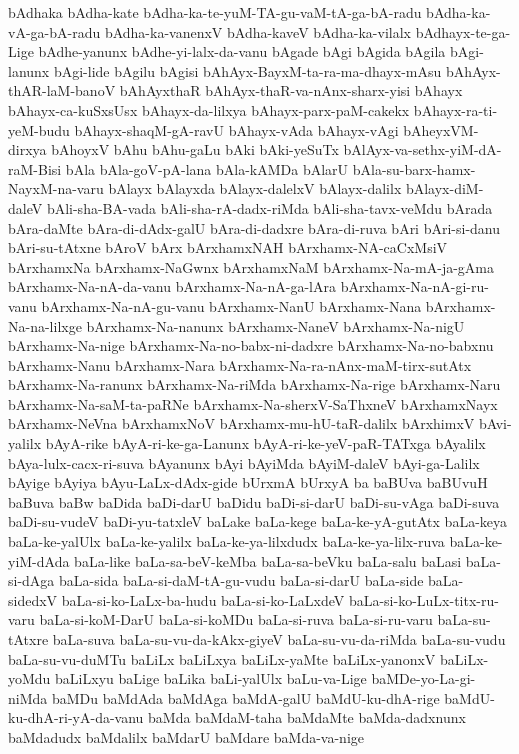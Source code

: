 {bAdhaka
bAdha-kate
bAdha-ka-te-yuM-TA-gu-vaM-tA-ga-bA-radu
bAdha-ka-vA-ga-bA-radu
bAdha-ka-vanenxV
bAdha-kaveV
bAdha-ka-vilalx
bAdhayx-te-ga-Lige
bAdhe-yanunx
bAdhe-yi-lalx-da-vanu
bAgade
bAgi
bAgida
bAgila
bAgi-lanunx
bAgi-lide
bAgilu
bAgisi
bAhAyx-BayxM-ta-ra-ma-dhayx-mAsu
bAhAyx-thAR-laM-banoV
bAhAyxthaR
bAhAyx-thaR-va-nAnx-sharx-yisi
bAhayx
bAhayx-ca-kuSxsUsx
bAhayx-da-lilxya
bAhayx-parx-paM-cakekx
bAhayx-ra-ti-yeM-budu
bAhayx-shaqM-gA-ravU
bAhayx-vAda
bAhayx-vAgi
bAheyxVM-dirxya
bAhoyxV
bAhu
bAhu-gaLu
bAki
bAki-yeSuTx
bAlAyx-va-sethx-yiM-dA-raM-Bisi
bAla
bAla-goV-pA-lana
bAla-kAMDa
bAlarU
bAla-su-barx-hamx-NayxM-na-varu
bAlayx
bAlayxda
bAlayx-dalelxV
bAlayx-dalilx
bAlayx-diM-daleV
bAli-sha-BA-vada
bAli-sha-rA-dadx-riMda
bAli-sha-tavx-veMdu
bArada
bAra-daMte
bAra-di-dAdx-galU
bAra-di-dadxre
bAra-di-ruva
bAri
bAri-si-danu
bAri-su-tAtxne
bAroV
bArx
bArxhamxNAH
bArxhamx-NA-caCxMsiV
bArxhamxNa
bArxhamx-NaGwnx
bArxhamxNaM
bArxhamx-Na-mA-ja-gAma
bArxhamx-Na-nA-da-vanu
bArxhamx-Na-nA-ga-lAra
bArxhamx-Na-nA-gi-ru-vanu
bArxhamx-Na-nA-gu-vanu
bArxhamx-NanU
bArxhamx-Nana
bArxhamx-Na-na-lilxge
bArxhamx-Na-nanunx
bArxhamx-NaneV
bArxhamx-Na-nigU
bArxhamx-Na-nige
bArxhamx-Na-no-babx-ni-dadxre
bArxhamx-Na-no-babxnu
bArxhamx-Nanu
bArxhamx-Nara
bArxhamx-Na-ra-nAnx-maM-tirx-sutAtx
bArxhamx-Na-ranunx
bArxhamx-Na-riMda
bArxhamx-Na-rige
bArxhamx-Naru
bArxhamx-Na-saM-ta-paRNe
bArxhamx-Na-sherxV-SaThxneV
bArxhamxNayx
bArxhamx-NeVna
bArxhamxNoV
bArxhamx-mu-hU-taR-dalilx
bArxhimxV
bAvi-yalilx
bAyA-rike
bAyA-ri-ke-ga-Lanunx
bAyA-ri-ke-yeV-paR-TATxga
bAyalilx
bAya-lulx-cacx-ri-suva
bAyanunx
bAyi
bAyiMda
bAyiM-daleV
bAyi-ga-Lalilx
bAyige
bAyiya
bAyu-LaLx-dAdx-gide
bUrxmA
bUrxyA
ba
baBUva
baBUvuH
baBuva
baBw
baDida
baDi-darU
baDidu
baDi-si-darU
baDi-su-vAga
baDi-suva
baDi-su-vudeV
baDi-yu-tatxleV
baLake
baLa-kege
baLa-ke-yA-gutAtx
baLa-keya
baLa-ke-yalUlx
baLa-ke-yalilx
baLa-ke-ya-lilxdudx
baLa-ke-ya-lilx-ruva
baLa-ke-yiM-dAda
baLa-like
baLa-sa-beV-keMba
baLa-sa-beVku
baLa-salu
baLasi
baLa-si-dAga
baLa-sida
baLa-si-daM-tA-gu-vudu
baLa-si-darU
baLa-side
baLa-sidedxV
baLa-si-ko-LaLx-ba-hudu
baLa-si-ko-LaLxdeV
baLa-si-ko-LuLx-titx-ru-varu
baLa-si-koM-DarU
baLa-si-koMDu
baLa-si-ruva
baLa-si-ru-varu
baLa-su-tAtxre
baLa-suva
baLa-su-vu-da-kAkx-giyeV
baLa-su-vu-da-riMda
baLa-su-vudu
baLa-su-vu-duMTu
baLiLx
baLiLxya
baLiLx-yaMte
baLiLx-yanonxV
baLiLx-yoMdu
baLiLxyu
baLige
baLika
baLi-yalUlx
baLu-va-Lige
baMDe-yo-La-gi-niMda
baMDu
baMdAda
baMdAga
baMdA-galU
baMdU-ku-dhA-rige
baMdU-ku-dhA-ri-yA-da-vanu
baMda
baMdaM-taha
baMdaMte
baMda-dadxnunx
baMdadudx
baMdalilx
baMdarU
baMdare
baMda-va-nige
}
